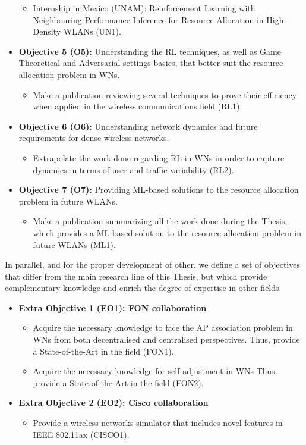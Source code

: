 \documentclass[12pt, a4paper,twoside]{tesi_upf}
\begin{document}
\begin{itemize}
\begin{itemize}
				\item Internship in Mexico (UNAM): Reinforcement Learning with Neighbouring Performance Inference for Resource Allocation in High-Density WLANs (UN1).
			\end{itemize}		
			\item \textbf{Objective 5 (O5):} Understanding the RL techniques, as well as Game Theoretical and Adversarial settings basics, that better suit the resource allocation problem in WNs. 
			\begin{itemize}
				\item Make a publication reviewing several techniques to prove their efficiency when applied in the wireless communications field (RL1).
			\end{itemize}		
			\item \textbf{Objective 6 (O6):} Understanding network dynamics and future requirements for dense wireless networks.
			\begin{itemize}
				\item Extrapolate the work done regarding RL in WNs in order to capture dynamics in terms of user and traffic variability (RL2). 
			\end{itemize}		
			\item \textbf{Objective 7 (O7):} Providing ML-based solutions to the resource allocation problem in future WLANs.
			\begin{itemize}
				\item Make a publication summarizing all the work done during the Thesis, which provides a ML-based solution to the resource allocation problem in future WLANs (ML1).
			\end{itemize}		
		\end{itemize}
	
		In parallel, and for the proper development of other, we define a set of objectives that differ from the main research line of this Thesis, but which provide complementary knowledge and enrich the degree of expertise in other fields.
		\begin{itemize}
			\item \textbf{Extra Objective 1 (EO1): FON collaboration} 
			\begin{itemize}
				\item Acquire the necessary knowledge to face the AP association problem in WNs from both decentralised and centralised perspectives. Thus, provide a State-of-the-Art in the field (FON1).
				\item Acquire the necessary knowledge for self-adjustment in WNs Thus, provide a State-of-the-Art in the field (FON2).
			\end{itemize}
			\item \textbf{Extra Objective 2 (EO2): Cisco collaboration} 
			\begin{itemize}
				\item Provide a wireless networks simulator that includes novel features in IEEE 802.11ax (CISCO1).
			\end{itemize}
		\end{itemize}
	
\end{document}
